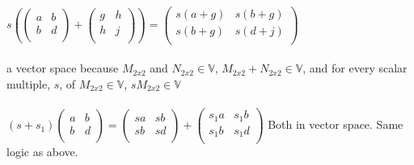 \documentclass{article}
\begin{document}
\begin{enumerate}
\begin{enumerate}
\\ \begin{math}
    s\left(\begin{pmatrix}
    a & b \\ 
    b & d \\ 
    \end{pmatrix} 
    +\begin{pmatrix}
    g & h \\ 
    h & j \\ 
    \end{pmatrix}\right) =
    \begin{pmatrix}
    s(a+g) & s(b+g) \\ 
    s(b+g) & s(d+j)\\ 

\end{pmatrix}     \end{math}
\\ \\ a vector space because $M_{2x2}$ and $N_{2x2} \in \mathbb{V}$, $M_{2x2} + N_{2x2}\in \mathbb{V}$, and for every scalar multiple, $s$, of $M_{2x2}\in \mathbb{V}$, $sM_{2x2}\in \mathbb{V}$
\\ \\
     \begin{math}
    (s+s_1)\begin{pmatrix}
    a & b \\ 
    b & d \\ 
    \end{pmatrix} =
    \begin{pmatrix}
    sa & sb\\ 
    sb & sd \\ 

    \end{pmatrix} 
    +\begin{pmatrix}
    s_1a & s_1b  \\ 
    s_1b & s_1d \\ 
    \end{pmatrix}
    \end{math} Both in vector space. Same logic as above.


\end{enumerate}
\end{enumerate}
\end{document}
